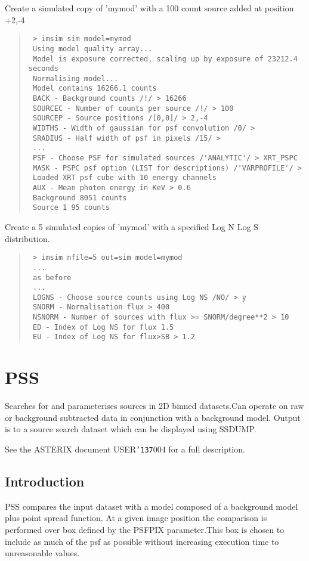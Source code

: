 \documentclass{book}
\renewcommand{\_}{{\tt\char'137}}     %
\begin{document}
Create a simulated copy of 'mymod' with a 100 count source added at
position +2,-4
\begin{quote}\begin{verbatim}
 > imsim sim model=mymod
 Using model quality array...
 Model is exposure corrected, scaling up by exposure of 23212.4 seconds
 Normalising model...
 Model contains 16266.1 counts
 BACK - Background counts /!/ > 16266
 SOURCEC - Number of counts per source /!/ > 100
 SOURCEP - Source positions /[0,0]/ > 2,-4
 WIDTHS - Width of gaussian for psf convolution /0/ >
 SRADIUS - Half width of psf in pixels /15/ >
 ...
 PSF - Choose PSF for simulated sources /'ANALYTIC'/ > XRT_PSPC
 MASK - PSPC psf option (LIST for descriptions) /'VARPROFILE'/ >
 Loaded XRT psf cube with 10 energy channels
 AUX - Mean photon energy in KeV > 0.6
 Background 8051 counts
 Source 1 95 counts
\end{verbatim}\end{quote}
Create a 5 simulated copies of 'mymod' with a specified Log N Log S
distribution.
\begin{quote}\begin{verbatim}
 > imsim nfile=5 out=sim model=mymod
 ...
 as before
 ...
 LOGNS - Choose source counts using Log NS /NO/ > y
 SNORM - Normalisation flux > 400
 NSNORM - Number of sources with flux >= SNORM/degree**2 > 10
 ED - Index of Log NS for flux 1.5
 EU - Index of Log NS for flux>SB > 1.2
\end{verbatim}\end{quote}
\section{PSS}
Searches for and parameterises sources in 2D binned datasets.Can
operate on raw or background subtracted data in conjunction with
a background model. Output is to a source search dataset which
can be displayed using SSDUMP.

See the ASTERIX document USER\_004 for a full description.

\subsection{Introduction}
PSS compares the input dataset with a model composed of a background
model plus point spread function. At a given image position the
comparison is performed over box defined by the PSFPIX parameter.This
box is chosen to include as much of the psf as possible without
increasing execution time to unreasonable values.
\end{document}
